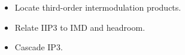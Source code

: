 \begin{objectives}
\begin{itemize}[leftmargin=1.4em,itemsep=2pt]
\item Locate third-order intermodulation products.
\item Relate IIP3 to IMD and headroom.
\item Cascade IP3.
\end{itemize}
\end{objectives}
